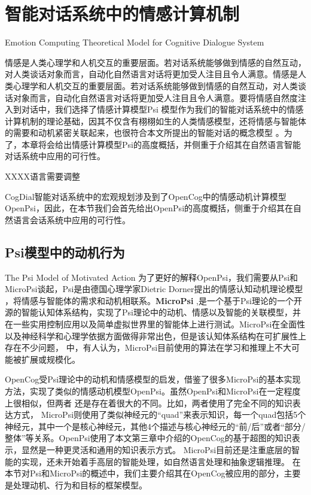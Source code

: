 \chapter{智能对话系统中的情感计算机制}{Emotion Computing Theoretical Model for Cognitive Dialogue System }
\label{chap:psi}


情感是人类心理学和人机交互的重要层面。若对话系统能够做到情感的自然互动，对人类谈话对象而言，自动化自然语言对话将更加受人注目且令人满意。情感是人类心理学和人机交互的重要层面。若对话系统能够做到情感的自然互动，对人类谈话对象而言，自动化自然语言对话将更加受人注目且令人满意。要将情感自然度注入到对话中，我们选择了情感计算模型Psi 模型作为我们的智能对话系统中的情感计算机制的理论基础，因其不仅含有栩栩如生的人类情感模型，还将情感与智能体的需要和动机紧密关联起来，也很符合本文所提出的智能对话的概念模型 。为了，本章将会给出情感计算模型Psi的高度概括，并侧重于介绍其在自然语言智能对话系统中应用的可行性。

XXXX语言需要调整



      CogDial智能对话系统中的宏观规划涉及到了OpenCog中的情感动机计算模型OpenPsi，因此，在本节我们会首先给出OpenPsi的高度概括，侧重于介绍其在自然语言会话系统中应用的可行性。

\section{Psi模型中的动机行为}{The Psi Model of Motivated Action}
       为了更好的解释OpenPsi，我们需要从Psi和MicroPsi谈起，Psi是由德国心理学家Dietric Dorner提出的情感认知动机理论模型 \cite{Dorner2002}，将情感与智能体的需求和动机相联系。{\bf MicroPsi} \cite{Bach2009},是一个基于Psi理论的一个开源的智能认知体系结构，实现了Psi理论中的动机、情感以及智能的关联模型，并在一些实用控制应用以及简单虚拟世界里的智能体上进行测试。MicroPsi在全面性以及神经科学和心理学依据方面做得非常出色，但是该认知体系结构在可扩展性上存在不少问题， \cite{EGI1}中，有人认为，MicroPsi目前使用的算法在学习和推理上不大可能被扩展或规模化。

       OpenCog受Psi理论中的动机和情感模型的启发，借鉴了很多MicroPsi的基本实现方法，实现了类似的情感动机模型OpenPsi。虽然OpenPsi和MicroPsi在一定程度上很相似，但两者 还是存在着很大的不同。比如，两者使用了完全不同的知识表达方式， MicroPsi则使用了类似神经元的“quad”来表示知识，每一个quad包括5个神经元，其中一个是核心神经元，其他4个描述与核心神经元的“前/后”或者“部分/整体”等关系。OpenPsi使用了本文第三章中介绍的OpenCog的基于超图的知识表示，显然是一种更灵活和通用的知识表示方式。 MicroPsi目前还是注重底层的智能的实现，还未开始着手高层的智能处理，如自然语言处理和抽象逻辑推理。
在本节对Psi和MicroPsi的概述中，我们主要介绍其在OpenCog被应用的部分，主要是处理动机、行为和目标的框架模型。

